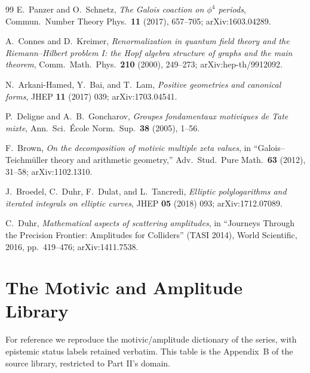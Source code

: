 \documentclass[12pt]{article}
\theoremstyle{definition}
\theoremstyle{remark}
\begin{document}
\begin{thebibliography}{99}
E.~Panzer and O.~Schnetz,
\emph{The Galois coaction on $\phi^4$ periods},
Commun.\ Number Theory Phys.\ \textbf{11} (2017), 657--705; arXiv:1603.04289.

A.~Connes and D.~Kreimer,
\emph{Renormalization in quantum field theory and the Riemann--Hilbert problem I: the Hopf
algebra structure of graphs and the main theorem},
Comm.\ Math.\ Phys.\ \textbf{210} (2000), 249--273; arXiv:hep-th/9912092.

N.~Arkani-Hamed, Y.~Bai, and T.~Lam,
\emph{Positive geometries and canonical forms},
JHEP \textbf{11} (2017) 039; arXiv:1703.04541.

P.~Deligne and A.~B.~Goncharov,
\emph{Groupes fondamentaux motiviques de Tate mixte},
Ann.\ Sci.\ \'Ecole Norm.\ Sup.\ \textbf{38} (2005), 1--56.

F.~Brown,
\emph{On the decomposition of motivic multiple zeta values},
in ``Galois--Teich\-m\"uller theory and arithmetic geometry,''
Adv.\ Stud.\ Pure Math.\ \textbf{63} (2012), 31--58; arXiv:1102.1310.

J.~Broedel, C.~Duhr, F.~Dulat, and L.~Tancredi,
\emph{Elliptic polylogarithms and iterated integrals on elliptic curves},
JHEP \textbf{05} (2018) 093; arXiv:1712.07089.

C.~Duhr,
\emph{Mathematical aspects of scattering amplitudes},
in ``Journeys Through the Precision Frontier: Amplitudes for Colliders'' (TASI 2014),
World Scientific, 2016, pp.~419--476; arXiv:1411.7538.

\end{thebibliography}

\appendix
\section[The Motivic and Amplitude Library]{The Motivic and Amplitude Library}
\label{app:library}

For reference we reproduce the motivic/amplitude dictionary of the series, with epistemic
status labels retained verbatim. This table is the Appendix~B of the source library,
restricted to Part II's domain.
\end{document}
